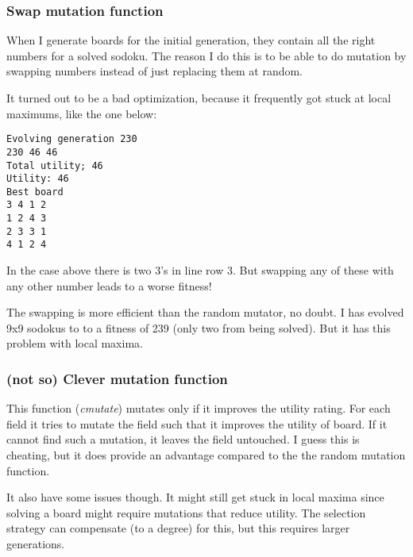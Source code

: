 \documentclass{article}
\begin{document}
\subsubsection{Swap mutation function}

When I generate boards for the initial generation, they contain 
all the right numbers for a solved sodoku. The reason I do this is
to be able to do mutation by swapping numbers instead
of just replacing them at random. 


It turned out to be a bad optimization, because it frequently got 
stuck at local maximums, like the one below:

\begin{verbatim}
Evolving generation 230
230 46 46
Total utility; 46
Utility: 46
Best board
3 4 1 2 
1 2 4 3 
2 3 3 1 
4 1 2 4 
\end{verbatim}

In the case above there is two 3's in line row 3. But swapping any
of these with any other number leads to a worse fitness!

The swapping is more efficient than the random mutator, no doubt. I 
has evolved 9x9 sodokus to to a fitness of 239 (only two from being
solved). But it has this problem with local maxima. 

\subsubsection{(not so) Clever mutation function}
This function (\emph{cmutate}) mutates only if it improves the utility rating.
For each field it tries to mutate the field such that it improves
the utility of board. If it cannot find such a mutation, it leaves
the field untouched. I guess this is cheating, but it does provide
an advantage compared to the the random mutation function.

It also have some issues though. It might still get stuck in
local maxima since solving a board might require mutations
that reduce utility. The selection strategy can compensate (to a
degree) for this, but this requires larger generations.
\end{document}
